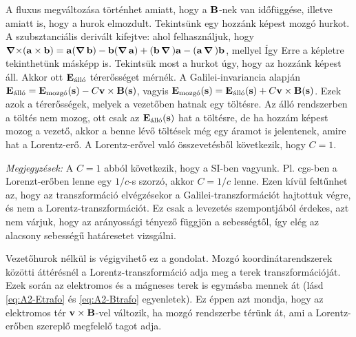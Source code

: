   A fluxus megváltozása történhet amiatt, hogy a $\mathbf{B}$-nek van időfüggése, illetve amiatt is, hogy a hurok elmozdult. Tekintsünk egy hozzánk képest mozgó hurkot. A szubsztanciális derivált kifejtve:
  ahol felhasználjuk, hogy $\mathop{\boldsymbol{\nabla}\times}\nolimits(\mathbf{a}\times\mathbf{b})=\mathbf{a}(\mathop{\boldsymbol{\nabla}}\nolimits{\mathbf{b}})-\mathbf{b}(\mathop{\boldsymbol{\nabla}}\nolimits{\mathbf{a}})+(\mathbf{b}\mathop{\boldsymbol{\nabla}}\nolimits{})\mathbf{a}-(\mathbf{a}\mathop{\boldsymbol{\nabla}}\nolimits{})\mathbf{b}$, mellyel
  Így
  Erre a képletre tekinthetünk másképp is. Tekintsük most a hurkot úgy, hogy az hozzánk képest áll. Akkor ott $\mathbf{E}_\text{álló}$ térerősséget mérnék. A Galilei-invariancia alapján $\mathbf{E}_\text{álló}=\mathbf{E}_\text{mozgó}(\mathbf{s})-C\mathbf{v}\times\mathbf{B}(\mathbf{s})$, vagyis $\mathbf{E}_\text{mozgó}(\mathbf{s})=\mathbf{E}_\text{álló}(\mathbf{s})+C\mathbf{v}\times\mathbf{B}(\mathbf{s})$. Ezek azok a térerősségek, melyek a vezetőben hatnak egy töltésre. Az álló rendszerben a töltés nem mozog, ott csak az $\mathbf{E}_\text{álló}(\mathbf{s})$ hat a töltésre, de ha hozzám képest mozog a vezető, akkor a benne lévő töltések még egy áramot is jelentenek, amire hat a Lorentz-erő. A Lorentz-erővel való összevetésből következik, hogy $C=1$.
  
  \emph{Megjegyzések:} A $C=1$ abból következik, hogy a SI-ben vagyunk. Pl. cgs-ben a Lorenzt-erőben lenne egy $1/c$-s szorzó, akkor $C=1/c$ lenne. Ezen kívül feltűnhet az, hogy az transzformáció elvégzésekor a Galilei-transzformációt hajtottuk végre, és nem a Lorentz-transzformációt. Ez csak a levezetés szempontjából érdekes, azt nem várjuk, hogy az arányossági tényező függjön a sebességtől, így elég az alacsony sebességű  határesetet vizsgálni.
  
  Vezetőhurok nélkül is végigvihető ez a gondolat. Mozgó koordinátarendszerek közötti áttérésnél a Lorentz-transzformáció adja meg a terek transzformációját. Ezek során az elektromos és a mágneses terek is egymásba mennek át (lásd \eqref{eq:A2-Etrafo} és \eqref{eq:A2-Btrafo} egyenletek). Ez éppen azt mondja, hogy az elektromos tér $\mathbf{v}\times \mathbf{B}$-vel változik, ha mozgó rendszerbe térünk át, ami a Lorentz-erőben szereplő megfelelő tagot adja.
  
